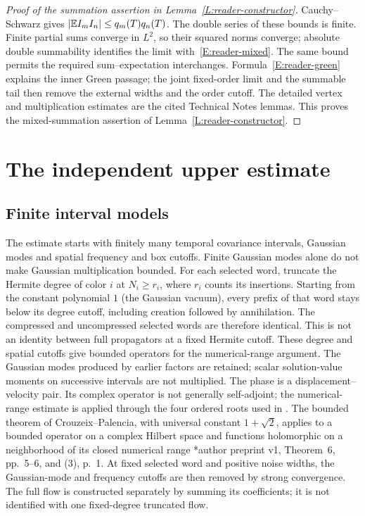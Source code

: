 \begin{proof}[Proof of the summation assertion in Lemma~\ref{L:reader-constructor}]
  Cauchy--Schwarz gives $|\mathbb E I_mI_n| \le q_m(T)q_n(T)$. The double series of
  these bounds is finite. Finite partial sums converge in $L^2$, so their
  squared norms converge; absolute double summability identifies the limit
  with~\eqref{E:reader-mixed}. The same bound permits the required
  sum--expectation interchanges. Formula~\eqref{E:reader-green} explains the
  inner Green passage; the joint fixed-order limit and the summable tail then
  remove the external widths and the order cutoff. The detailed vertex and
  multiplication estimates are the cited Technical Notes lemmas. This proves the
  mixed-summation assertion of Lemma~\ref{L:reader-constructor}.
\end{proof}


\section{The independent upper estimate}\label{S:reader-independent}
\subsection{Finite interval models}

The estimate starts with finitely many temporal covariance intervals, Gaussian
modes and spatial frequency and box cutoffs. Finite Gaussian modes alone do not
make Gaussian multiplication bounded. For each selected word, truncate the
Hermite degree of color $i$ at $N_i \ge r_i$, where $r_i$ counts its insertions.
Starting from the constant polynomial $1$ (the Gaussian vacuum), every prefix of
that word stays below its degree cutoff, including creation followed by
annihilation. The compressed and uncompressed selected words are therefore
identical. This is not an identity between full propagators at a fixed Hermite
cutoff. These degree and spatial cutoffs give bounded operators for the
numerical-range argument. The Gaussian modes produced by earlier factors are
retained; scalar solution-value moments on successive intervals are not
multiplied. The phase is a displacement--velocity pair. Its complex operator is
not generally self-adjoint; the numerical-range estimate is applied through the
four ordered roots used in . The bounded theorem
of Crouzeix--Palencia, with universal constant $1+\sqrt2$, applies to a bounded
operator on a complex Hilbert space and functions holomorphic on a neighborhood
of its closed numerical range
\cite{crouzeix.palencia:source2017:numerical}*{author preprint v1, Theorem~6,
pp.~5--6, and (3), p.~1}. At fixed selected word and positive noise widths, the
Gaussian-mode and frequency cutoffs are then removed by strong convergence. The
full flow is constructed separately by summing its coefficients; it is not
identified with one fixed-degree truncated flow.

